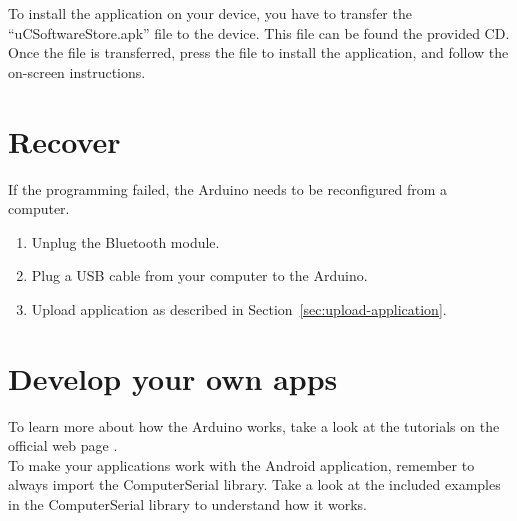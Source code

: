 	To install the application on your device, you have to transfer the ``uCSoftwareStore.apk'' file to the device. This file can be found the provided CD. Once the file is transferred, press the file to install the application, and follow the on-screen instructions.
	
	\section{Recover}
	If the programming failed, the Arduino needs to be reconfigured from a computer.\\
	
	\begin{enumerate}
	\item Unplug the Bluetooth module.
	
	\item Plug a USB cable from your computer to the Arduino.
	
	\item Upload application as described in Section~\ref{sec:upload-application}.
	\end{enumerate}
	
	
	\section{Develop your own apps}
	To learn more about how the Arduino works, take a look at the tutorials on the official web page \cite{arduino-tutorials}.\\
	
	To make your applications work with the Android application, remember to always import the ComputerSerial library. Take a look at the included examples in the ComputerSerial library to understand how it works.